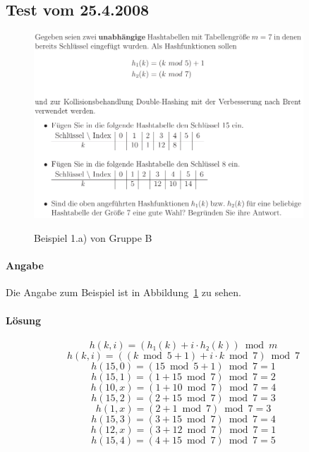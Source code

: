 \documentclass[a4paper, 12pt]{article}
\begin{document}
\subsection{Test vom 25.4.2008}

\begin{figure}[htbp]
	\caption{Beispiel 1.a) von Gruppe B}
	\vskip 0.2cm
	\centering
	\includegraphics[width=0.9\textwidth]{Figures/Test_2010-01-14_1Ba}
	\label{figure:Test_2010-01-14_1Ba}
\end{figure}

\paragraph{Angabe}

Die Angabe zum Beispiel ist in Abbildung~\ref{figure:Test_2010-01-14_1Ba} zu sehen.

\paragraph{Lösung}

\[
	h\left(k, i\right) =
	\left( h₁\left(k\right) + i ⋅ h₂\left(k\right) \right) \bmod{m}
\]
\[
	h\left(k, i \right) =
	\left( \left( k \bmod{5} + 1 \right) + i ⋅ k \bmod{7} \right) \bmod{7}
\]
\[
	h\left(15, 0 \right) =
	\left( 15 \bmod{5} +1 \right) \bmod{7} = 1
\]
\[
	h\left(15, 1 \right) =
	\left( 1 + 15 \bmod{7} \right) \bmod{7} = 2
\]
\[
	h\left(10, x \right) =
	\left( 1 + 10 \bmod{7} \right) \bmod{7} = 4
\]
\[
	h\left(15, 2 \right) =
	\left( 2 + 15 \bmod{7} \right) \bmod{7} = 3
\]
\[
	h\left(1, x \right) =
	\left( 2 + 1 \bmod{7} \right) \bmod{7} = 3
\]
\[
	h\left(15, 3 \right) =
	\left( 3 + 15 \bmod{7} \right) \bmod{7} = 4
\]
\[
	h\left(12, x \right) =
	\left( 3 + 12 \bmod{7} \right) \bmod{7} = 1
\]
\[
	h\left(15, 4 \right) =
	\left( 4 + 15 \bmod{7} \right) \bmod{7} = 5
\]
\end{document}
